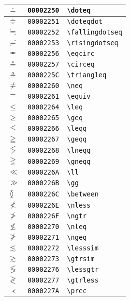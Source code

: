 \begin{longtable}{|l|l|l|}
\hline
$\doteq$ & \texttt{00002250} & \verb|\doteq| \\
\hline
$\doteqdot$ & \texttt{00002251} & \verb|\doteqdot| \\
\hline
$\fallingdotseq$ & \texttt{00002252} & \verb|\fallingdotseq| \\
\hline
$\risingdotseq$ & \texttt{00002253} & \verb|\risingdotseq| \\
\hline
$\eqcirc$ & \texttt{00002256} & \verb|\eqcirc| \\
\hline
$\circeq$ & \texttt{00002257} & \verb|\circeq| \\
\hline
$\triangleq$ & \texttt{0000225C} & \verb|\triangleq| \\
\hline
$\neq$ & \texttt{00002260} & \verb|\neq| \\
\hline
$\equiv$ & \texttt{00002261} & \verb|\equiv| \\
\hline
$\leq$ & \texttt{00002264} & \verb|\leq| \\
\hline
$\geq$ & \texttt{00002265} & \verb|\geq| \\
\hline
$\leqq$ & \texttt{00002266} & \verb|\leqq| \\
\hline
$\geqq$ & \texttt{00002267} & \verb|\geqq| \\
\hline
$\lneqq$ & \texttt{00002268} & \verb|\lneqq| \\
\hline
$\gneqq$ & \texttt{00002269} & \verb|\gneqq| \\
\hline
$\ll$ & \texttt{0000226A} & \verb|\ll| \\
\hline
$\gg$ & \texttt{0000226B} & \verb|\gg| \\
\hline
$\between$ & \texttt{0000226C} & \verb|\between| \\
\hline
$\nless$ & \texttt{0000226E} & \verb|\nless| \\
\hline
$\ngtr$ & \texttt{0000226F} & \verb|\ngtr| \\
\hline
$\nleq$ & \texttt{00002270} & \verb|\nleq| \\
\hline
$\ngeq$ & \texttt{00002271} & \verb|\ngeq| \\
\hline
$\lesssim$ & \texttt{00002272} & \verb|\lesssim| \\
\hline
$\gtrsim$ & \texttt{00002273} & \verb|\gtrsim| \\
\hline
$\lessgtr$ & \texttt{00002276} & \verb|\lessgtr| \\
\hline
$\gtrless$ & \texttt{00002277} & \verb|\gtrless| \\
\hline
$\prec$ & \texttt{0000227A} & \verb|\prec| \\
\hline

\end{longtable}
